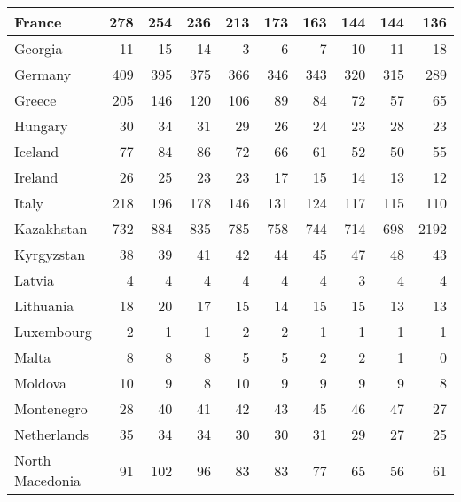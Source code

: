 \begin{table}
\begin{tabular}{|l|r|r|r|r|r|r|r|r|r|}
                        France&    278&    254&    236&    213&    173&    163&    144&    144&    136\\\hline
                       Georgia&     11&     15&     14&      3&      6&      7&     10&     11&     18\\\hline
                       Germany&    409&    395&    375&    366&    346&    343&    320&    315&    289\\\hline
                        Greece&    205&    146&    120&    106&     89&     84&     72&     57&     65\\\hline
                       Hungary&     30&     34&     31&     29&     26&     24&     23&     28&     23\\\hline
                       Iceland&     77&     84&     86&     72&     66&     61&     52&     50&     55\\\hline
                       Ireland&     26&     25&     23&     23&     17&     15&     14&     13&     12\\\hline
                         Italy&    218&    196&    178&    146&    131&    124&    117&    115&    110\\\hline
                    Kazakhstan&    732&    884&    835&    785&    758&    744&    714&    698&   2192\\\hline
                    Kyrgyzstan&     38&     39&     41&     42&     44&     45&     47&     48&     43\\\hline
                        Latvia&      4&      4&      4&      4&      4&      4&      3&      4&      4\\\hline
                     Lithuania&     18&     20&     17&     15&     14&     15&     15&     13&     13\\\hline
                    Luxembourg&      2&      1&      1&      2&      2&      1&      1&      1&      1\\\hline
                         Malta&      8&      8&      8&      5&      5&      2&      2&      1&      0\\\hline
                       Moldova&     10&      9&      8&     10&      9&      9&      9&      9&      8\\\hline
                    Montenegro&     28&     40&     41&     42&     43&     45&     46&     47&     27\\\hline
                   Netherlands&     35&     34&     34&     30&     30&     31&     29&     27&     25\\\hline
               North Macedonia&     91&    102&     96&     83&     83&     77&     65&     56&     61\\\hline

\end{tabular}
\end{table}
